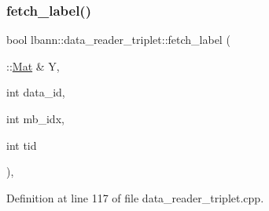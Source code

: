 \mbox{\label{classlbann_1_1data__reader__triplet_a69dc790a54edde4d123fd7e62df6e5b8}} 
\subsubsection{\texorpdfstring{fetch\+\_\+label()}{fetch\_label()}}
{\footnotesize\ttfamily bool lbann\+::data\+\_\+reader\+\_\+triplet\+::fetch\+\_\+label (\begin{DoxyParamCaption}\item[{\+::\hyperlink{base_8hpp_a68f11fdc31b62516cb310831bbe54d73}{Mat} \&}]{Y,  }\item[{int}]{data\+\_\+id,  }\item[{int}]{mb\+\_\+idx,  }\item[{int}]{tid }\end{DoxyParamCaption})\hspace{0.3cm}{\ttfamily [override]}, {\ttfamily [protected]}}



Definition at line 117 of file data\+\_\+reader\+\_\+triplet.\+cpp.



